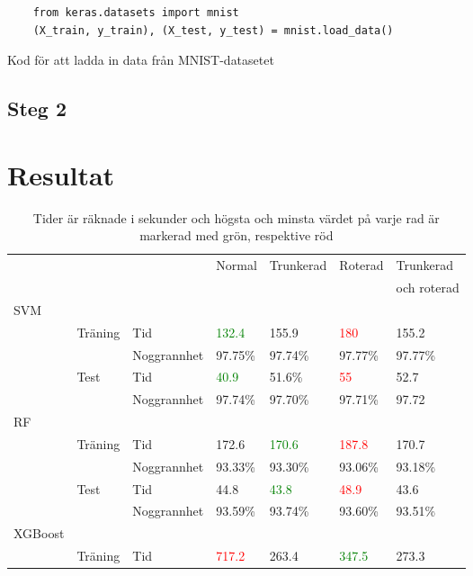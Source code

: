 \documentclass[12pt,a4paper]{article}
\begin{document}
\begin{table}[t]
  \begin{verbatim}
    from keras.datasets import mnist
    (X_train, y_train), (X_test, y_test) = mnist.load_data()
  \end{verbatim}
  \caption[short]{\footnotesize{Kod för att ladda in data från MNIST-datasetet}}
\end{table}

\subsection{Steg 2}
\section{Resultat}

\begin{table}[t]
	\centering
	\footnotesize
	\caption{Tider är räknade i sekunder och högsta och minsta värdet på varje rad är markerad med grön, respektive röd}
	\begin{tabular}{lll | llll}
      \hline 
			&		&			& Normal				& Trunkerad			& Roterad				& Trunkerad			\\
		 	&		& 			&					&					&					& och roterad			\\
      \hline 
	SVM 	&		& 			&					&					&					&					\\
			& Träning	& Tid			& \textcolor{green}{132.4}	& 155.9				& \textcolor{red}{180}	& 155.2				\\
			&		& Noggrannhet	& 97.75\%				& 97.74\%				& 97.77\%				& 97.77\%				\\
			& Test	& Tid			& \textcolor{green}{40.9}	& 51.6\%				& \textcolor{red}{55}		& 52.7				\\
			&		& Noggrannhet	& 97.74\%				& 97.70\%				& 97.71\%				& 97.72				\\
	RF 		&		& 			&					&					&					&					\\
			& Träning	& Tid			& 172.6				& \textcolor{green}{170.6}	& \textcolor{red}{187.8}	& 170.7 				\\
			&		& Noggrannhet	& 93.33\%				& 93.30\%				& 93.06\%				& 93.18\%				\\
			& Test	& Tid			& 44.8				& \textcolor{green}{43.8}	& \textcolor{red}{48.9}	& 43.6				\\
			&		& Noggrannhet	& 93.59\%				& 93.74\%				& 93.60\%				& 93.51\%				\\
	XGBoost 	&		& 			&					&					&					&					\\
			& Träning	& Tid			& \textcolor{red}{717.2}	& 263.4				& \textcolor{green}{347.5}	& 273.3				\\

\end{tabular}
\end{table}
\end{document}
